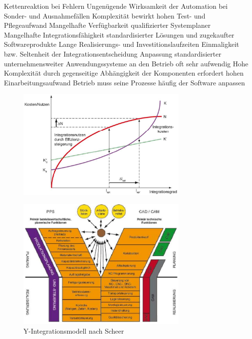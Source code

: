 \documentclass[ngerman,a4paper,12pt]{scrreprt}
\begin{document}
\ul
	\li Kettenreaktion bei Fehlern
	\li Ungenügende Wirksamkeit der Automation bei Sonder- und Ausnahmefällen
	\li Komplexität bewirkt hohen Test- und Pflegeaufwand
	\li Mangelhafte Verfügbarkeit qualifizierter Systemplaner
	\li Mangelhafte Integrationsfähigkeit standardisierter Lösungen und zugekaufter
Softwareprodukte
	\li Lange Realisierungs- und Investitionslaufzeiten
	\li Einmaligkeit bzw. Seltenheit der Integrationsentscheidung
	\li Anpassung standardisierter unternehmensweiter Anwendungssysteme an den
	\li Betrieb oft sehr aufwendig
	\li Hohe Komplexität durch gegenseitige Abhängigkeit der Komponenten
erfordert hohen Einarbeitungsaufwand
	\li Betrieb muss seine Prozesse häufig der Software anpassen
\ulE

\begin{figure}[H]
	\centering
	\includegraphics[width=0.75\textwidth]{img/V9.1.jpg}
	\caption{}
	\label{}
\end{figure}

\begin{figure}[H]
	\centering
	\includegraphics[width=0.75\textwidth]{img/V9.2.jpg}
	\caption{Y-Integrationsmodell nach Scheer}
	\label{}
\end{figure}
\end{document}
